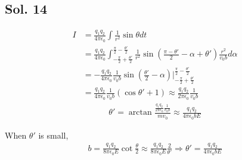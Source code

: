 \subsection*{Sol. 14}
\begin{align*}
    I & =\frac{q_1q_2}{4\pi\epsilon_0}\int
    \frac{1}{r^2}\sin\theta dt \\
      & =
    \frac{q_1q_2}{4\pi\epsilon_0}
    \int_{-\frac{\pi}{2}+\frac{\theta' }{2}}^{\frac{\pi}{2}-\frac{\theta' }{2}}
    \frac{1}{r^2}\sin(
    \frac{\pi-\theta'}{2}
    -\alpha + \theta '
    ) \frac{r^2}{v_0 b}d\alpha \\
      & =
    -\frac{q_1q_2}{4\pi\epsilon_0}
    \frac{1}{v_0 b}
    \sin(\frac{\theta'}{2}-\alpha)\bigg|^{\frac{\pi}{2}-\frac{\theta' }{2}}
                                        _{-\frac{\pi}{2}+\frac{\theta' }{2}} \\
      & =
    \frac{q_1q_2}{4\pi\epsilon_0}
    \frac{1}{v_0 b}(\cos\theta'+1)
    \approx\frac{q_1q_2}{2\pi\epsilon_0}
    \frac{1}{v_0 b}
\end{align*}
\begin{align*}
    \theta ' = \arctan\frac{\frac{q_1q_2}{2\pi\epsilon_0}
                          \frac{1}{v_0 b}}{mv_0}
    \approx \frac{q_1q_2}{4\pi\epsilon_0 bE}
\end{align*}

When $\theta'$ is small,
\begin{align*}
    b = \frac{q_1q_2}{8\pi\epsilon_0 E}\cot\frac{\theta }{2}
    \approx
    \frac{q_1q_2}{8\pi\epsilon_0 E}\frac{2}{\theta'}
    \Rightarrow \theta'
    =\frac{q_1q_2}{4\pi\epsilon_0 bE}
\end{align*}

